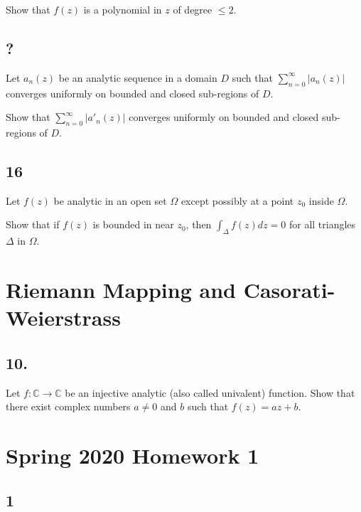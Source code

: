 Show that \(f(z)\) is a polynomial in \(z\) of degree \(\leq 2\).

\hypertarget{section-18}{%
\subsection{?}\label{section-18}}

Let \(a_n(z)\) be an analytic sequence in a domain \(D\) such that
\(\displaystyle \sum_{n=0}^\infty |a_n(z)|\) converges uniformly on
bounded and closed sub-regions of \(D\).

Show that \(\displaystyle \sum_{n=0}^\infty |a'_n(z)|\) converges
uniformly on bounded and closed sub-regions of \(D\).

\hypertarget{section-19}{%
\subsection{16}\label{section-19}}

Let \(f(z)\) be analytic in an open set \(\Omega\) except possibly at a
point \(z_0\) inside \(\Omega\).

Show that if \(f(z)\) is bounded in near \(z_0\), then
\(\displaystyle \int_\Delta f(z) dz = 0\) for all triangles \(\Delta\)
in \(\Omega\).

\hypertarget{riemann-mapping-and-casorati-weierstrass}{%
\section{Riemann Mapping and
Casorati-Weierstrass}\label{riemann-mapping-and-casorati-weierstrass}}

\hypertarget{section-20}{%
\subsection{10.}\label{section-20}}

Let \(f: {\mathbb C} \rightarrow {\mathbb C}\) be an injective analytic
(also called univalent) function. Show that there exist complex numbers
\(a \neq 0\) and \(b\) such that \(f(z) = az + b\).

\hypertarget{spring-2020-homework-1}{%
\section{Spring 2020 Homework 1}\label{spring-2020-homework-1}}

\hypertarget{section-21}{%
\subsection{1}\label{section-21}}

